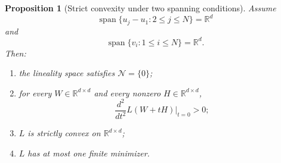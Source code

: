 \documentclass[11pt]{article}
\newtheorem{proposition}[theorem]{Proposition}
\newcommand{\R}{\mathbb{R}}
\newcommand{\cN}{\mathcal{N}}
\newcommand{\1}{\mathbf{1}}
\newcommand{\Span}{\operatorname{span}}
\begin{document}
\begin{proposition}[Strict convexity under two spanning conditions]
\label{prop:strict-convexity}
Assume
\begin{equation}
\Span\{u_j-u_1:2\le j\le N\}
=
\R^d
\label{eq:u-span}
\end{equation}
and
\begin{equation}
\Span\{v_i:1\le i\le N\}
=
\R^d.
\label{eq:v-span}
\end{equation}
Then:

\begin{enumerate}[label=(\roman*)]
\item the lineality space satisfies \(\cN=\{0\}\);

\item for every \(W\in\R^{d\times d}\) and every nonzero
\(H\in\R^{d\times d}\),
\[
\frac{d^2}{dt^2}L(W+tH)\bigg|_{t=0}>0;
\]

\item \(L\) is strictly convex on \(\R^{d\times d}\);

\item \(L\) has at most one finite minimizer.
\end{enumerate}
\end{proposition}
\end{document}
